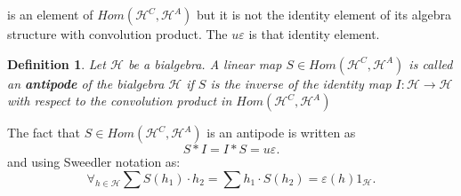 \documentclass[a4paper, 12pt]{article}
\newtheorem{definition}{Definition}
\begin{document}
is an
element of $Hom(\mathcal{H}^C, \mathcal{H}^A)$ but it is not the identity element of its algebra structure
with convolution product. The $u\varepsilon$ is that identity element.
\begin{definition}
Let $\mathcal{H}$ be a bialgebra. A linear map $S \in Hom(\mathcal{H}^C, \mathcal{H}^A)$ is called an
\textbf{antipode} of the bialgebra $\mathcal{H}$ if $S$ is the inverse of the identity map
$I : \mathcal{H} \to \mathcal{H}$ with respect to the convolution product in
$Hom(\mathcal{H}^C, \mathcal{H}^A)$
\end{definition}
The fact that $S \in Hom(\mathcal{H}^C, \mathcal{H}^A)$ is an antipode is written as
\begin{equation*}
S * I = I * S = u\varepsilon.
\end{equation*}
and using Sweedler notation as:
\begin{equation*}
\forall_{h \in \mathcal{H}} \sum S(h_1) \cdot h_2 = \sum h_1 \cdot S(h_2) = \varepsilon(h)1_\mathcal{H}.
\end{equation*}
\end{document}
